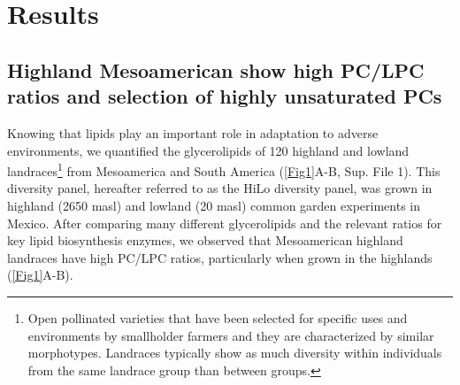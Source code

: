 \documentclass[9pt,twocolumn,twoside,lineno]{biorxiv}
\begin{document}
\section{Results}
\label{sec:results}
\subsection{Highland Mesoamerican  show high PC/LPC ratios and selection of highly unsaturated PCs}
Knowing that lipids play an important role in adaptation to adverse environments, we quantified the glycerolipids of 120 highland and lowland landraces\footnote[1]{Open pollinated varieties that have been selected for specific uses and environments by smallholder farmers and they are characterized by similar morphotypes. Landraces typically show as much diversity within individuals from the same landrace group than between groups.} from Mesoamerica and South America (\cref{Fig1}A-B, Sup. File 1). 
This  diversity panel, hereafter referred to as the HiLo diversity panel, was grown in highland (2650 masl) and lowland (20 masl) common garden experiments in Mexico.
After comparing many different glycerolipids and the relevant ratios for key lipid biosynthesis enzymes, we observed that Mesoamerican highland landraces have high PC/LPC ratios, particularly when grown in the highlands (\cref{Fig1}A-B).
\end{document}
